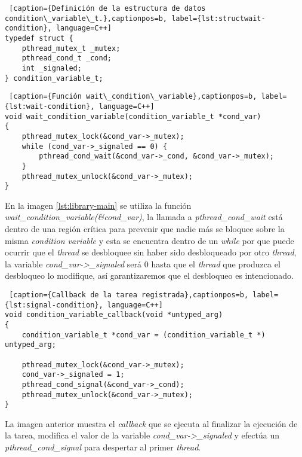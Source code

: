 \smallskip

\begin{lstlisting} [caption={Definición de la estructura de datos condition\_variable\_t.},captionpos=b, label={lst:structwait-condition}, language=C++]
typedef struct {
    pthread_mutex_t _mutex;
    pthread_cond_t _cond;
    int _signaled;
} condition_variable_t;
\end{lstlisting}

\smallskip

\begin{lstlisting} [caption={Función wait\_condition\_variable},captionpos=b, label={lst:wait-condition}, language=C++]
void wait_condition_variable(condition_variable_t *cond_var)
{
    pthread_mutex_lock(&cond_var->_mutex);
    while (cond_var->_signaled == 0) {
        pthread_cond_wait(&cond_var->_cond, &cond_var->_mutex);
    }
    pthread_mutex_unlock(&cond_var->_mutex);
}
\end{lstlisting}

En la imagen \ref{lst:library-main} se utiliza la función \textit{wait\_condition\_variable(&cond\_var)}, la llamada a  \textit{pthread\_cond\_wait} está dentro de una región crítica para prevenir que nadie más se bloquee sobre la misma \textit{condition variable} y esta se encuentra dentro de un \textit{while} por que puede ocurrir que el \textit{thread} se desbloquee sin haber sido desbloqueado por otro \textit{thread}, la variable \textit{cond\_var->\_signaled} será 0 hasta que el \textit{thread} que produzca el desbloqueo lo modifique, así garantizaremos que el desbloqueo es intencionado.
\smallskip

\begin{lstlisting} [caption={Callback de la tarea registrada},captionpos=b, label={lst:signal-condition}, language=C++]
void condition_variable_callback(void *untyped_arg)
{
    condition_variable_t *cond_var = (condition_variable_t *) untyped_arg;

    pthread_mutex_lock(&cond_var->_mutex);
    cond_var->_signaled = 1;
    pthread_cond_signal(&cond_var->_cond);
    pthread_mutex_unlock(&cond_var->_mutex);
}
\end{lstlisting}

La imagen anterior muestra el \textit{callback} que se ejecuta al finalizar la ejecución de la tarea, modifica el valor de la variable \textit{cond\_var->\_signaled} y efectúa un \textit{pthread\_cond\_signal} para despertar al primer \textit{thread}.

\bigskip

